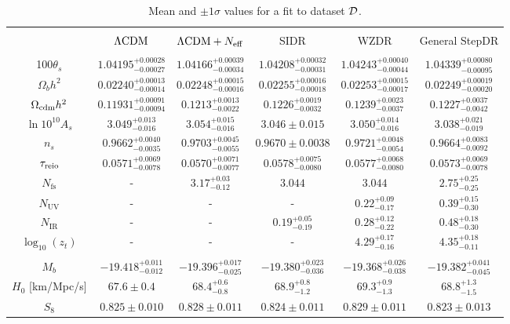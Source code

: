 \documentclass[aps,prd,twocolumn,nofootinbib,superscriptaddress]{revtex4}
\newcommand{\D}{\cal{D}}
\newcommand{\nir}{N_\text{IR}}
\newcommand{\nuv}{N_\text{UV}}
\newcommand{\nfs}{N_\text{fs}}
\newcommand{\zt}{z_t}
\newcommand{\Neff}{N_{\rm eff}}
\begin{document}
\begin{table*}[h!]{ }
	\centering
	\begin{tabular}{|c | c | c | c | c | c |} 
		\hline &&&&&\\[-8pt]
		& $\Lambda{\rm CDM}$ & $ \Lambda{\rm CDM} + \Neff$ & SIDR &  WZDR & General StepDR  \\
		\hline &&&&&\\[-8pt]
		100$\theta_s$ & $1.04195 ^{+0.00028}_{-0.00027}$ & $1.04166^{+0.00039}_{-0.00034}$ & $1.04208^{+0.00032}_{-0.00031}$ & $1.04243^{+0.00040}_{-0.00044}$ & $1.04339^{+0.00080}_{-0.00095}$  \\  [3pt]
		$\Omega_b h^2$ & $0.02240^{+0.00013}_{-0.00014} $ & $0.02248^{+0.00015}_{-0.00016}$  & $0.02255^{+0.00016}_{-0.00018}$ &  $0.02253^{+0.00015}_{-0.00017}$ &$ 0.02249^{+0.00019}_{-0.00020} $   \\ [3pt]
		$ \Omega_{\rm cdm}h^2$ & $ 0.11931^{+0.00091}_{-0.00094}$ & $0.1213^{+0.0013}_{-0.0022}$ & $0.1226^{+0.0019}_{-0.0032} $ & $0.1239^{+0.0023}_{-0.0037}$ & $0.1227^{+0.0037}_{-0.0042} $\\ [3pt]
		$\ln 10^{10} A_s$  &	$3.049^{+0.013}_{-0.016} $ & $3.054^{+0.015}_{-0.016} $ & $3.046 \pm 0.015$ & $3.050^{+0.014}_{-0.016} $ &$3.038^{+0.021}_{-0.019}$ \\ [3pt]
		$n_s$ & $0.9662^{+0.0040}_{-0.0035}$& $0.9703^{+0.0045}_{-0.0055} $ & $0.9670 \pm 0.0038 $ & $0.9721^{+0.0048}_{-0.0054} $ &$0.9664^{+0.0083}_{-0.0092}$\\ [3pt]
		$\tau_{\rm reio}$ &$0.0571^{+0.0069}_{-0.0078}$ & $0.0570^{+0.0071}_{-0.0077} $ & $0.0578^{+0.0075}_{-0.0080} $ & $0.0577^{+0.0068}_{-0.0080} $ &$0.0573^{+0.0069}_{-0.0078}$ \\ [3pt]
		$\nfs  $  & - & $3.17 ^{+0.03}_{-0.12} $ & $3.044 $& $3.044 $& $2.75^{+0.25}_{-0.25} $  \\ [3pt]
		$\nuv $  &-&-&-& $0.22^{+0.09}_{-0.17} $ & $0.39^{+0.15}_{-0.30} $  \\ [3pt]			
		$\nir $  &- &-& $0.19^{+0.05}_{-0.19} $ & $0.28^{+0.12}_{-0.22} $ & $0.48^{+0.18}_{-0.30} $  \\ [3pt]
		$\log_{10} (\zt)$  &- &- &- & $4.29^{+0.17}_{-0.16} $ & $4.35^{+0.18}_{-0.11} $ \\ [3pt] \hline  &&&&&\\[-8pt]	
		$M_b $ & ${-19.418}^{+0.011}_{-0.012} $ & ${-19.396}^{+0.017}_{-0.025}$ & ${-19.380}^{+0.023}_{-0.036}$ & ${-19.368}^{+0.026}_{-0.038}$ & ${-19.382}^{+0.041}_{-0.045} $ \\ [3pt]
		$H_0$ [km/Mpc/s] & $67.6 \pm 0.4 $ &  $68.4^{+0.6}_{-0.8} $ & $68.9^{+0.8}_{-1.2} $ & $69.3^{+0.9}_{-1.3}$ & $68.8^{+1.3}_{-1.5} $ \\ [3pt]
		$S_8$ & $0.825  \pm 0.010 $& $0.828 \pm 0.011 $ & $0.824 \pm 0.011 $ & $0.829 \pm  0.011 $ &$0.823 \pm 0.013$  \\  [3pt] \hline
		
	\end{tabular}
	\caption{Mean and $\pm 1 \sigma$ values for a fit to dataset $\D$.}
	\label{tb:meanD}
\end{table*}
\end{document}
